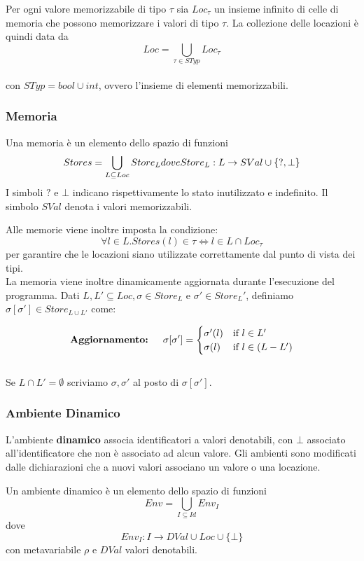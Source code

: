 \documentclass[a4paper, 10pt]{article}
\begin{document}
	Per ogni valore memorizzabile di tipo $\tau$ sia $Loc_\tau$ un insieme infinito di celle di memoria che possono memorizzare i valori di tipo $\tau$.
	La collezione delle locazioni è quindi data da 
	\[
	Loc=\bigcup\limits_{\tau\in STyp} Loc_\tau
	\] 
	\\ con $STyp=bool \cup int$, ovvero l'insieme di elementi memorizzabili.
	
	\subsubsection{Memoria}
	Una memoria è un elemento dello spazio di funzioni 
	\[
	Stores=\bigcup\limits_{L\subseteq Loc} Store_L$$ \\ dove $$Store_L:L\to SVal \cup \{?, \bot\}
	\]
	I simboli $?$ e $\bot$ indicano rispettivamente lo stato inutilizzato e indefinito. Il simbolo $SVal$ denota i valori memorizzabili.
	
	Alle memorie viene inoltre imposta la condizione:
	$$\forall l \in L.Stores(l) \in \tau \iff l\in L\cap Loc_\tau$$ per garantire che le locazioni siano utilizzate correttamente dal punto di vista dei tipi. \\
	
	La memoria viene inoltre dinamicamente aggiornata durante l'esecuzione del programma. Dati $L,L' \subseteq Loc, \sigma \in Store_L$ e $\sigma' \in Store_L'$, definiamo $\sigma [\sigma'] \in Store_{L \cup L'}$ come:
	
	\[
	\textup{\textbf{Aggiornamento: }} \quad
	\sigma[\sigma'] = 
	\begin{cases} 
	\sigma'(l) &\mbox{if } l\in L' \\ 
	\sigma (l) & \mbox{if } l \in (L-L') 
	\end{cases}
	\] \\
	
	Se $L\cap L'=\emptyset$ scriviamo $\sigma, \sigma'$ al posto di $\sigma [\sigma']$.
	
	\subsubsection{Ambiente Dinamico}
	L'ambiente \textbf{dinamico} associa identificatori a valori denotabili, con $\bot$ associato all'identificatore che non è associato ad alcun valore. Gli ambienti sono modificati dalle dichiarazioni che a nuovi valori associano un valore o una locazione.
	
	Un ambiente dinamico è un elemento dello spazio di funzioni 
	\[
	Env=\bigcup\limits_{I\subseteq Id} Env_I
	\]
	dove
	\[
	Env_I:I \to DVal \cup Loc\cup \{\bot\}
	\] 
	con metavariabile $\rho$ e $DVal$ valori denotabili.
	
\end{document}
